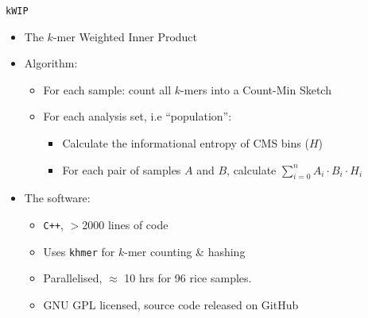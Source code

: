 \documentclass[t]{beamer}
\begin{document}
\begin{frame}{\texttt{kWIP}}
  \begin{itemize}
    \item The $k$-mer Weighted Inner Product
    \pause
    \item Algorithm:
      \begin{itemize}
        \item For each sample: count all $k$-mers into a Count-Min Sketch
        \pause
        \item For each analysis set, i.e ``population'':
          \begin{itemize}
            \item Calculate the informational entropy of CMS bins ($H$)
            \item For each pair of samples $A$ and $B$, calculate
              $\sum^{n}_{i=0} A_i \cdot B_i \cdot H_i$
          \end{itemize}
      \end{itemize}
    \pause
    \item The software:
      \begin{itemize}
        \item \texttt{C++}, $>$2000 lines of code
        \item Uses \texttt{khmer} for $k$-mer counting \& hashing
        \item Parallelised, $\approx$ 10 hrs for 96 rice samples.
        \item GNU GPL licensed, source code released on GitHub
      \end{itemize}
  \end{itemize}
\end{frame}
\end{document}
